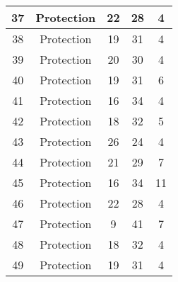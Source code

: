 \documentclass[results.tex]{subfiles}
\begin{document}
\begin{center}
\begin{tabular}{| c || c | c | c | c |}
            \hline
            37                      & Protection                   & 22                     & 28                      & 4                    \\
            \hline
            38                      & Protection                   & 19                     & 31                      & 4                    \\
            \hline
            39                      & Protection                   & 20                     & 30                      & 4                    \\
            \hline
            40                      & Protection                   & 19                     & 31                      & 6                    \\
            \hline
            41                      & Protection                   & 16                     & 34                      & 4                    \\
            \hline
            42                      & Protection                   & 18                     & 32                      & 5                    \\
            \hline
            43                      & Protection                   & 26                     & 24                      & 4                    \\
            \hline
            44                      & Protection                   & 21                     & 29                      & 7                    \\
            \hline
            45                      & Protection                   & 16                     & 34                      & 11                   \\
            \hline
            46                      & Protection                   & 22                     & 28                      & 4                    \\
            \hline
            47                      & Protection                   & 9                      & 41                      & 7                    \\
            \hline
            48                      & Protection                   & 18                     & 32                      & 4                    \\
            \hline
            49                      & Protection                   & 19                     & 31                      & 4                    \\
            \hline
        \end{tabular}
    \end{center}
\end{document}
